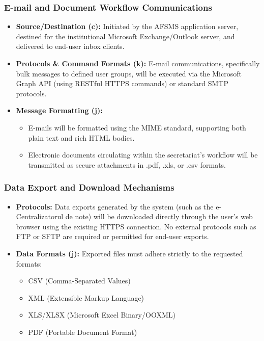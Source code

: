 \documentclass[11pt, a4paper]{article}
\begin{document}
\subsubsection{E-mail and Document Workflow Communications}
\begin{itemize}
    \item \textbf{Source/Destination (c):} Initiated by the AFSMS application server, destined for the institutional Microsoft Exchange/Outlook server, and delivered to end-user inbox clients.
    \item \textbf{Protocols \& Command Formats (k):} E-mail communications, specifically bulk messages to defined user groups, will be executed via the Microsoft Graph API (using RESTful HTTPS commands) or standard SMTP protocols.
    \item \textbf{Message Formatting (j):}
    \begin{itemize}
        \item E-mails will be formatted using the MIME standard, supporting both plain text and rich HTML bodies.
        \item Electronic documents circulating within the secretariat's workflow will be transmitted as secure attachments in .pdf, .xls, or .csv formats.
    \end{itemize}
\end{itemize}

\subsubsection{Data Export and Download Mechanisms}
\begin{itemize}
    \item \textbf{Protocols:} Data exports generated by the system (such as the e-Centralizatorul de note) will be downloaded directly through the user's web browser using the existing HTTPS connection. No external protocols such as FTP or SFTP are required or permitted for end-user exports.
    \item \textbf{Data Formats (j):} Exported files must adhere strictly to the requested formats:
    \begin{itemize}
        \item CSV (Comma-Separated Values)
        \item XML (Extensible Markup Language)
        \item XLS/XLSX (Microsoft Excel Binary/OOXML)
        \item PDF (Portable Document Format)
    \end{itemize}
\end{itemize}
\end{document}
